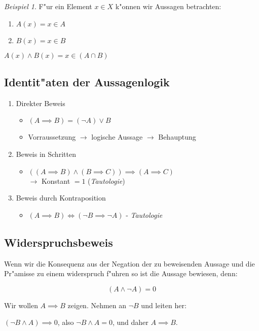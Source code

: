 \documentclass[11pt]{article}
\theoremstyle{remark}
\newtheorem{exa}{Beispiel}[section]
\theoremstyle{definition}
\theoremstyle{remark}
\begin{document}
\begin{exa}
F"ur ein Element \(x\in X\) k"onnen wir Aussagen betrachten:
\begin{enumerate}
\item \(A(x)=x\in A\)
\item \(B(x)=x\in B\)
\end{enumerate}
\(A(x)\wedge B(x)=x\in (A\cap B)\)
\end{exa}

\subsection{Identit"aten der Aussagenlogik}
\label{sec:orgd743b6e}
\begin{relation}
\begin{enumerate}
\item Direkter Beweis 
\begin{itemize}
\item \((A\implies B) = (\neg A)\vee B\)
\item Vorraussetzung \(\rightarrow\) logische Aussage \(\rightarrow\) Behauptung
\end{itemize}
\item Beweis in Schritten
\begin{itemize}
\item \(((A\implies B)\wedge (B\implies C))\implies (A\implies C)\) \\
\(\rightarrow\) Konstant \(=1\) (\emph{Tautologie})
\end{itemize}
\item Beweis durch Kontraposition
\begin{itemize}
\item \((A\implies B) \iff (\neg B \implies \neg A)\) - \emph{Tautologie}
\end{itemize}
\end{enumerate}
\end{relation}

\subsection{Widerspruchsbeweis}
\label{sec:org54c9d02}
Wenn wir die Konsequenz aus der Negation der zu beweisenden Aussage und die
Pr"amisse zu einem widerspruch f"uhren so ist die Aussage bewiesen, denn:
\begin{relation}
\[(A\wedge \neg A)=0\]
\end{relation}


Wir wollen \(A\implies B\) zeigen.
Nehmen an \(\neg B\) und leiten her:\\
\begin{relation}
\((\neg B \wedge A)\implies 0\), also \(\neg B\wedge A = 0\), und daher \(A\implies
B\).
\end{relation}
\end{document}
